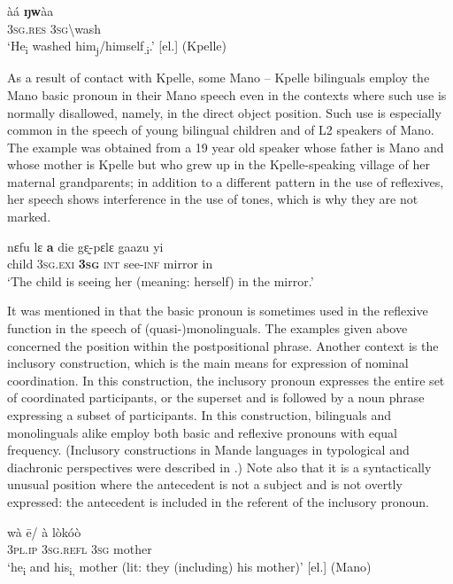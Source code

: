 \documentclass[output=paper]{langscibook}
\begin{document}
\ea
    \label{ex:Kachaturyan:44}
 \gll àá  \textbf{ŋw}àa\\
     3\textsc{sg.res}  \textsc{3sg{\textbackslash}}wash\\
\glt ‘He\textsubscript{i} washed him\textsubscript{j}/himself\textsubscript{.i}.’ [el.] (Kpelle)\z

As a result of contact with Kpelle, some Mano – Kpelle bilinguals employ the Mano basic pronoun in their Mano speech even in the contexts where such use is normally disallowed, namely, in the direct object position. Such use is especially common in the speech of young bilingual children and of L2 speakers of Mano. The example  was obtained from a 19 year old speaker whose father is Mano and whose mother is Kpelle but who grew up in the Kpelle-speaking village of her maternal grandparents; in addition to a different pattern in the use of reflexives, her speech shows interference in the use of tones, which is why they are not marked.

\ea
    \label{ex:Kachaturyan:45}
 \gll nɛfu  lɛ  \textbf{a}  die  gɛ̰-pɛlɛ  gaazu  yi\\
       child  \textsc{3sg.exi}  \textbf{\textsc{3sg}} \textsc{int}  see\textsc{{}-inf}  mirror  in\\
\glt ‘The child is seeing her (meaning: herself) in the mirror.’\z

It was mentioned in  that the basic pronoun is sometimes used in the reflexive function in the speech of (quasi-)monolinguals. The examples given above concerned the position within the postpositional phrase. Another context is the inclusory construction, which is the main means for expression of nominal coordination. In this construction, the inclusory pronoun expresses the entire set of coordinated participants, or the superset and is followed by a noun phrase expressing a subset of participants. In this construction, bilinguals and monolinguals alike employ both basic and reflexive pronouns with equal frequency. (Inclusory constructions in Mande languages in typological and diachronic perspectives were described in \citealt{Khachaturyan2019}.) Note also that it is a syntactically unusual position where the antecedent is not a subject and is not overtly expressed: the antecedent is included in the referent of the inclusory pronoun.

\ea
    \label{ex:Kachaturyan:46}
 \gll wà  ē/  à  lòkóò  \\
     \textsc{3pl.ip}  \textsc{3sg.refl}  \textsc{3sg}  mother \\
\glt ‘he\textsubscript{i} and his\textsubscript{i,} mother (lit: they (including) his mother)’ [el.] (Mano)
\z
\end{document}
